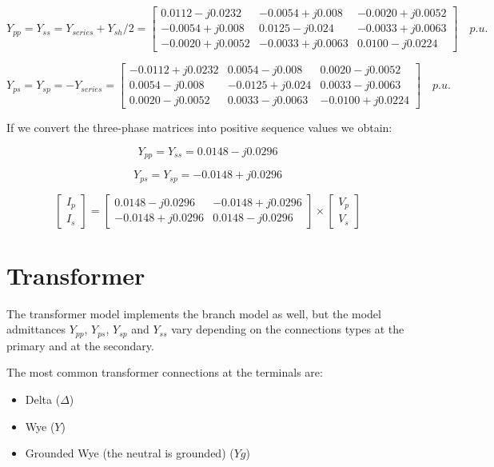 \documentclass[a4paper,twoside,fleqn]{tufte-book}
\begin{document}
$$
Y_{pp} = Y_{ss} = Y_{series} + Y_{sh}/2 = \left[ \begin{array}{ccc}
0.0112-j0.0232  & -0.0054+j0.008   & -0.0020+j0.0052 \\ -0.0054+j0.008  &  0.0125-j0.024 & -0.0033+j0.0063 \\ -0.0020+j0.0052 &  -0.0033+j0.0063 & 0.0100-j0.0224
\end{array} \right]\quad  p.u.
$$

$$
Y_{ps} = Y_{sp} = -Y_{series} = \left[ \begin{array}{ccc}
-0.0112+j0.0232  & 0.0054-j0.008   & 0.0020-j0.0052 \\  0.0054-j0.008  &  -0.0125+j0.024 & 0.0033-j0.0063 \\  0.0020-j0.0052 &  0.0033-j0.0063 & -0.0100+j0.0224
\end{array} \right]\quad  p.u.
$$

If we convert the three-phase matrices into positive sequence values we obtain:

$$
Y_{pp} = Y_{ss} = 0.0148 -j0.0296
$$

$$
Y_{ps} = Y_{sp} = -0.0148 +j0.0296
$$


$$
\left[\begin{array}{c}
I_p \\
I_s
\end{array}\right] = \left[\begin{array}{cc}
0.0148 -j0.0296 & -0.0148 +j0.0296\\
-0.0148 +j0.0296 & 0.0148 -j0.0296
\end{array}\right] \times \left[\begin{array}{c}
V_p \\
V_s
\end{array}\right]
$$



\newpage
\section{Transformer}

The transformer model implements the branch model as well, but the model admittances $Y_{pp}$, $Y_{ps}$, $Y_{sp}$ and $Y_{ss}$ vary depending on the connections types at the primary and at the secondary.

The most common transformer connections at the terminals are:

\begin{itemize}
\item Delta ($\Delta$)
\item Wye ($Y$)
\item Grounded Wye (the neutral is grounded) ($Yg$)
\end{itemize}
\end{document}
